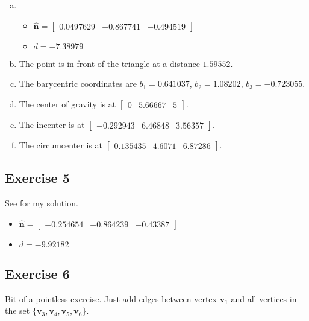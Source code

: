 \documentclass[11pt]{article}
\begin{document}
\begin{enumerate}[a.]
	\item %
	\begin{itemize}
	\item $\hat{\textbf{n}}=\begin{bmatrix}
		 0.0497629 & -0.867741 & -0.494519
	\end{bmatrix}$
	\item $d=-7.38979$
	\end{itemize}
	
	\item %
	The point is in front of the triangle at a distance $1.59552$.
	
	\item %
	The barycentric coordinates are $b_1 = 0.641037$, $b_2 = 1.08202$, $b_3 = -0.723055$.
	
	\item %
	The center of gravity is at $\begin{bmatrix}
		0 & 5.66667 & 5
	\end{bmatrix}$.
	
	\item %
	The incenter is at $\begin{bmatrix}
		-0.292943 & 6.46848 & 3.56357
	\end{bmatrix}$.
	
	\item %
	The circumcenter is at $\begin{bmatrix}
		0.135435 & 4.6071 & 6.87286
	\end{bmatrix}$.
\end{enumerate}

\subsection{Exercise 5}

See  for my solution.

\begin{itemize}
	\item $\hat{\textbf{n}}=\begin{bmatrix}
		 -0.254654 & -0.864239 & -0.43387
	\end{bmatrix}$
	\item $d=-9.92182$
\end{itemize}

\subsection{Exercise 6}

Bit of a pointless exercise. Just add edges between vertex $\textbf{v}_1$ and all vertices in the set $\{\textbf{v}_3, \textbf{v}_4, \textbf{v}_5, \textbf{v}_6\}$.
\end{document}
